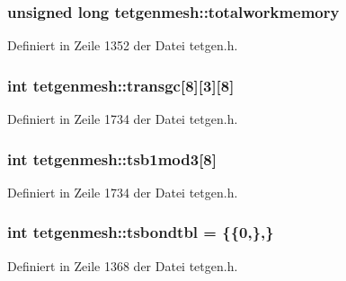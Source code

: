 \hypertarget{classtetgenmesh_a67341ca5f2c0ece12052d62316f99363}{
\subsubsection[{totalworkmemory}]{\setlength{\rightskip}{0pt plus 5cm}unsigned long tetgenmesh\-::totalworkmemory}}\label{classtetgenmesh_a67341ca5f2c0ece12052d62316f99363}


Definiert in Zeile 1352 der Datei tetgen.\-h.

\hypertarget{classtetgenmesh_a606af36503a05864a66eed7887031f92}{
\subsubsection[{transgc}]{\setlength{\rightskip}{0pt plus 5cm}int tetgenmesh\-::transgc\mbox{[}8\mbox{]}\mbox{[}3\mbox{]}\mbox{[}8\mbox{]}}}\label{classtetgenmesh_a606af36503a05864a66eed7887031f92}


Definiert in Zeile 1734 der Datei tetgen.\-h.

\hypertarget{classtetgenmesh_abcdcec3f841610fe91a0160b4e3a838e}{
\subsubsection[{tsb1mod3}]{\setlength{\rightskip}{0pt plus 5cm}int tetgenmesh\-::tsb1mod3\mbox{[}8\mbox{]}}}\label{classtetgenmesh_abcdcec3f841610fe91a0160b4e3a838e}


Definiert in Zeile 1734 der Datei tetgen.\-h.

\hypertarget{classtetgenmesh_a053685b4d9d852983e842a33a95c31e4}{
\subsubsection[{tsbondtbl}]{\setlength{\rightskip}{0pt plus 5cm}int tetgenmesh\-::tsbondtbl = \{\{0,\},\}\hspace{0.3cm}{\ttfamily [static]}}}\label{classtetgenmesh_a053685b4d9d852983e842a33a95c31e4}


Definiert in Zeile 1368 der Datei tetgen.\-h.

